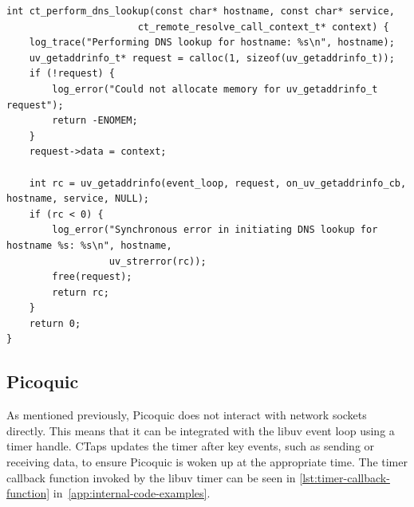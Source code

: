 \begin{listing}[htbp]
  \begin{verbatim}
int ct_perform_dns_lookup(const char* hostname, const char* service,
                       ct_remote_resolve_call_context_t* context) {
    log_trace("Performing DNS lookup for hostname: %s\n", hostname);
    uv_getaddrinfo_t* request = calloc(1, sizeof(uv_getaddrinfo_t));
    if (!request) {
        log_error("Could not allocate memory for uv_getaddrinfo_t request");
        return -ENOMEM;
    }
    request->data = context;

    int rc = uv_getaddrinfo(event_loop, request, on_uv_getaddrinfo_cb, hostname, service, NULL);
    if (rc < 0) {
        log_error("Synchronous error in initiating DNS lookup for hostname %s: %s\n", hostname,
                  uv_strerror(rc));
        free(request);
        return rc;
    }
    return 0;
}
  \end{verbatim}
  \caption[CTaps DNS lookup function]{Example of using the asynchronous \texttt{uv\_getaddrinfo()} utility function,
      instead of the synchronous \texttt{getaddrinfo()}.}
  \label{lst:get-addrinfo-uv}
\end{listing}

\subsection{Picoquic}
As mentioned previously, Picoquic does not interact with network 
sockets directly. This means that it can be integrated with the
libuv event loop using a timer handle. CTaps updates the timer after key events,
such as sending or receiving data, to ensure Picoquic is woken up at the appropriate time.
The timer callback function
invoked by the libuv timer can be seen in
\cref{lst:timer-callback-function} in~\cref{app:internal-code-examples}.
